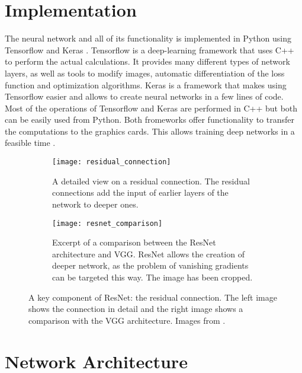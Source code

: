 \section{Implementation}

The neural network and all of its functionality is implemented in Python using Tensorflow \cite{tensorflow} and Keras \cite{keras}. Tensorflow is a deep-learning framework that uses C++ to perform the actual calculations. It provides many different types of network layers, as well as tools to modify images, automatic differentiation of the loss function and optimization algorithms. Keras is a framework that makes using Tensorflow easier and allows to create neural networks in a few lines of code. Most of the operations of Tensorflow and Keras are performed in C++ but both can be easily used from Python. Both fromeworks offer functionality to transfer the computations to the graphics cards. This allows training deep networks in a feasible time \cite{ylecun}.

\begin{figure}[!tbp]
	\centering
	\begin{subfigure}[t]{0.47\textwidth}
		\centering
    	\texttt{[image: residual\_connection]}
    	\caption{A detailed view on a residual connection. The residual connections add the input of earlier layers of the network to deeper ones.}
    	\label{fig:residual_connection}
	\end{subfigure}
	\hfill
	\begin{subfigure}[t]{0.47\textwidth}
		\centering
    	\texttt{[image: resnet\_comparison]}
    	\caption{Excerpt of a comparison between the ResNet architecture and VGG. ResNet allows the creation of deeper network, as the problem of vanishing gradients can be targeted this way. The image has been cropped.}
    	\label{fig:resnet_comparison}
	\end{subfigure}
	\caption{A key component of ResNet: the residual connection. The left image shows the connection in detail and the right image shows a comparison with the VGG architecture. Images from \cite{resnet}.}
	\label{fig:resnet_details}
\end{figure} 

\section{Network Architecture}


